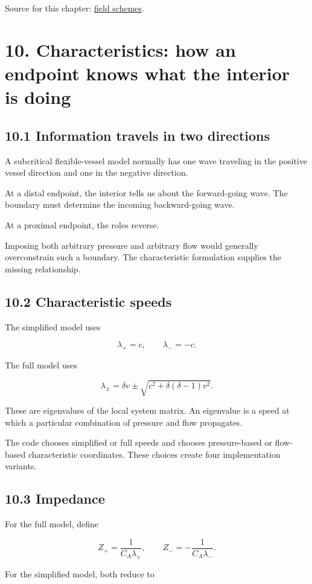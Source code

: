 \documentclass[11pt,a4paper]{article}
\begin{document}
Source for this chapter: \href{/home/sadid/starfish/SolverLib/classFields.py}{field schemes}.

\clearpage
\section{10. Characteristics: how an endpoint knows what the interior is doing}
\subsection{10.1 Information travels in two directions}
A subcritical flexible-vessel model normally has one wave traveling in the positive vessel direction and one in the negative direction.

At a distal endpoint, the interior tells us about the forward-going wave. The boundary must determine the incoming backward-going wave.

At a proximal endpoint, the roles reverse.

Imposing both arbitrary pressure and arbitrary flow would generally overconstrain such a boundary. The characteristic formulation supplies the missing relationship.

\subsection{10.2 Characteristic speeds}
The simplified model uses


\begingroup\small
\[
\lambda_+=c,\qquad \lambda_-=-c.
\]
\endgroup


The full model uses


\begingroup\small
\[
\lambda_\pm
=\delta v\pm
\sqrt{c^2+\delta(\delta-1)v^2}.
\]
\endgroup


These are eigenvalues of the local system matrix. An eigenvalue is a speed at which a particular combination of pressure and flow propagates.

The code chooses simplified or full speeds and chooses pressure-based or flow-based characteristic coordinates. These choices create four implementation variants.

\subsection{10.3 Impedance}
For the full model, define


\begingroup\small
\[
Z_+=\frac1{C_A\lambda_+},
\qquad
Z_-=-\frac1{C_A\lambda_-}.
\]
\endgroup


For the simplified model, both reduce to
\end{document}
